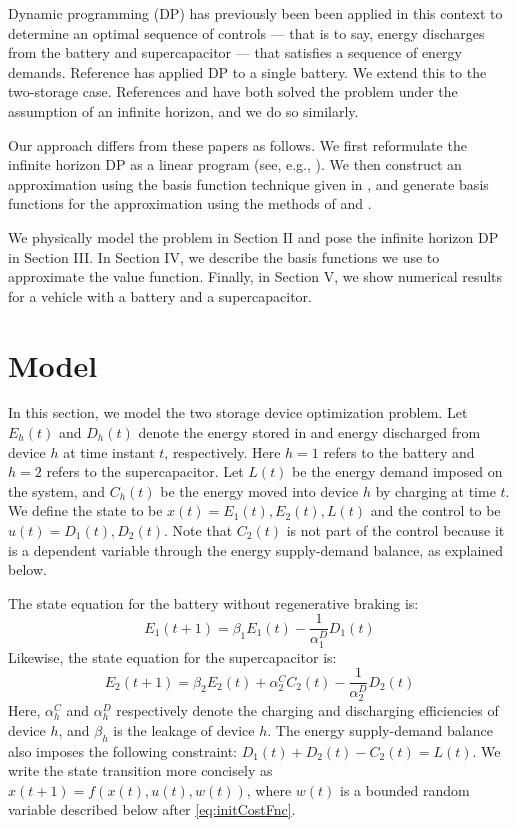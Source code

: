 \documentclass[conference]{IEEEtran}
\begin{document}
Dynamic programming (DP) has previously been been applied in this context to determine an optimal sequence of controls --- that is to say, energy discharges from the battery and supercapacitor --- that satisfies a sequence of energy demands. Reference \cite{su2013modeling} has applied DP to a single battery. We extend this to the two-storage case. References \cite{8330176} and \cite{8315074} have both solved the problem under the assumption of an infinite horizon, and we do so similarly.

Our approach differs from these papers as follows. We first reformulate the infinite horizon DP as a linear program (see, e.g., \cite{Bertsekas:2007:DPO:1396348}). We then construct an approximation using the basis function technique given in \cite{deFarias:2003:LPA:970869.970918}, and generate basis functions for the approximation using the methods of \cite{Bellman:1957} and \cite{Bellman1962}. %

We physically model the problem in Section II and pose the infinite horizon DP in Section III. In Section IV, we describe the basis functions we use to approximate the value function. Finally, in Section V, we show numerical results for a vehicle with a battery and a supercapacitor. 


\section{Model}
In this section, we model the two storage device optimization problem. Let $E_{h}(t)$ and $D_{h}(t)$ denote the energy stored in and energy discharged from device $h$ at time instant $t$, respectively. Here $h=1$ refers to the battery and $h=2$ refers to the supercapacitor. Let $L(t)$ be the energy demand imposed on the system, and $C_{h}(t)$ be the energy moved into device $h$ by charging at time $t$. We define the state to be $x(t)=E_{1}(t),E_{2}(t),L(t)$ and the control to be $u(t)=D_{1}(t),D_{2}(t)$. Note that $C_{2}(t)$ is not part of the control because it is a dependent variable through the energy supply-demand balance, as explained below.

The state equation for the battery without regenerative braking is:
\begin{equation} \label{eq:BattStateEqn}
    E_{1}(t+1)=\beta_{1}E_{1}(t)-\frac{1}{\alpha_{1}^{D}}D_{1}(t)
\end{equation} Likewise, the state equation for the supercapacitor is:
\begin{equation} \label{eq:SupercStateEqn}
    E_{2}(t+1)=\beta_{2}E_{2}(t)+\alpha_{2}^{C}C_{2}(t)-\frac{1}{\alpha_{2}^{D}}D_{2}(t)
\end{equation} Here, $\alpha^{C}_{h}$ and $\alpha^{D}_{h}$ respectively denote the charging and discharging efficiencies of device $h$, and $\beta_{h}$ is the leakage of device $h$. The energy supply-demand balance also imposes the following constraint: $D_{1}(t) + D_{2}(t) - C_{2}(t) = L(t)$. We write the state transition more concisely as $x(t+1)=f(x(t),u(t),w(t))$, where $w(t)$ is a bounded random variable described below after \eqref{eq:initCostFnc}.
\end{document}
